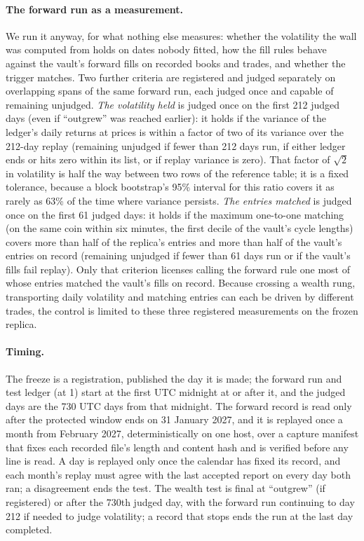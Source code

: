 \documentclass[11pt]{article}
\begin{document}
\paragraph{The forward run as a measurement.} We run it anyway, for what nothing else measures: whether the volatility the wall was computed from holds on dates nobody fitted, how the fill rules behave against the vault's forward fills on recorded books and trades, and whether the trigger matches. Two further criteria are registered and judged separately on overlapping spans of the same forward run, each judged once and capable of remaining unjudged. \emph{The volatility held} is judged once on the first 212 judged days (even if ``outgrew'' was reached earlier): it holds if the variance of the ledger's daily returns at prices is within a factor of two of its variance over the 212-day replay (remaining unjudged if fewer than 212 days run, if either ledger ends or hits zero within its list, or if replay variance is zero). That factor of $\sqrt2$ in volatility is half the way between two rows of the reference table; it is a fixed tolerance, because a block bootstrap's 95\% interval for this ratio covers it as rarely as 63\% of the time where variance persists. \emph{The entries matched} is judged once on the first 61 judged days: it holds if the maximum one-to-one matching (on the same coin within six minutes, the first decile of the vault's cycle lengths) covers more than half of the replica's entries and more than half of the vault's entries on record (remaining unjudged if fewer than 61 days run or if the vault's fills fail replay). Only that criterion licenses calling the forward rule one most of whose entries matched the vault's fills on record. Because crossing a wealth rung, transporting daily volatility and matching entries can each be driven by different trades, the control is limited to these three registered measurements on the frozen replica.

\paragraph{Timing.} The freeze is a registration, published the day it is made; the forward run and test ledger (at 1) start at the first UTC midnight at or after it, and the judged days are the 730 UTC days from that midnight. The forward record is read only after the protected window ends on 31 January 2027, and it is replayed once a month from February 2027, deterministically on one host, over a capture manifest that fixes each recorded file's length and content hash and is verified before any line is read. A day is replayed only once the calendar has fixed its record, and each month's replay must agree with the last accepted report on every day both ran; a disagreement ends the test. The wealth test is final at ``outgrew'' (if registered) or after the 730th judged day, with the forward run continuing to day 212 if needed to judge volatility; a record that stops ends the run at the last day completed.
\end{document}
